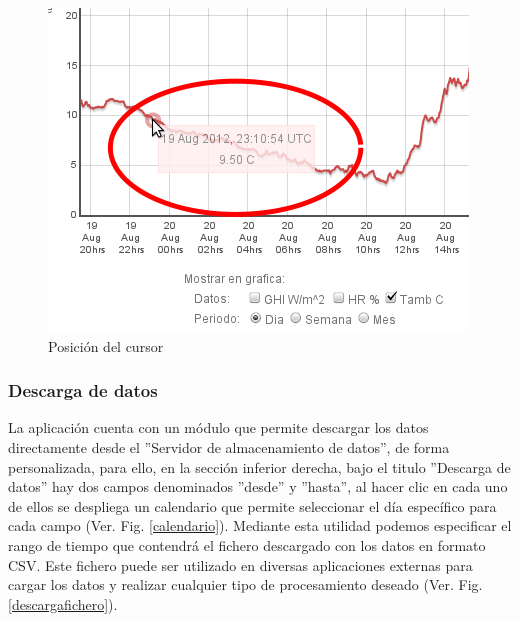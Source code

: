 \begin{figure}[ht]
\begin{minipage}[b]{0.32\linewidth}
        \end{minipage}
	\begin{minipage}[b]{0.32\linewidth}
                \centering
                \includegraphics[scale=0.35]{./images/cap5chap1img4-3}
        \end{minipage}
	\caption{Posición del cursor}
	\label{cursor}
\end{figure}

\newpage
\subsubsection{Descarga de datos}
La aplicación cuenta con un módulo que permite descargar los datos directamente desde el ''Servidor de almacenamiento de datos'', de forma personalizada, para ello, en la sección inferior derecha, bajo el titulo ''Descarga de datos'' hay dos campos denominados ''desde'' y ''hasta'', al hacer clic en cada uno de ellos se despliega un calendario que permite seleccionar el día específico para cada campo (Ver. Fig. \ref{calendario}). Mediante esta utilidad podemos especificar el rango de tiempo que contendrá el fichero descargado con los datos en formato CSV. Este fichero puede ser utilizado en diversas aplicaciones externas para cargar los datos y realizar cualquier tipo de procesamiento deseado (Ver. Fig. \ref{descargafichero}).

